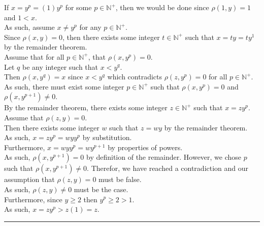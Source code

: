 \documentclass[a4paper,12pt]{article}
\begin{document}
\noindent If $x = y^p = (1)y^p$ for some $p \in \mathbb{N}^+$, then we would be done since $\rho(1, y) = 1$ and $1 < x$.\\

\noindent As such, assume $x \neq y^p$ for any $p \in \mathbb{N}^+$.\\

\noindent Since $\rho(x, y) = 0$, then there exists some integer $t \in \mathbb{N}^+$ such that $x = ty = ty^1$ by the remainder theorem.\\

\noindent Assume that for all $p \in \mathbb{N}^+$, that $\rho(x, y^p) = 0$.\\

\noindent Let $q$ be any integer such that $x < y^q$.\\

\noindent Then $\rho(x, y^q) = x$ since $x < y^q$ which contradicts $\rho(z, y^p) = 0$ for all $p \in \mathbb{N}^+$.\\

\noindent As such, there must exist some integer $p \in \mathbb{N}^+$ such that $\rho(x, y^p) = 0$ and $\rho(x, y^{p + 1}) \neq 0$.\\

\noindent By the remainder theorem, there exists some integer $z \in \mathbb{N}^+$ such that $x = zy^p$.\\

\noindent Assume that $\rho(z, y) = 0$.\\

\noindent Then there exists some integer $w$ such that $z = wy$ by the remainder theorem.\\

\noindent As such, $x = zy^p = wyy^p$ by substitution.\\

\noindent Furthermore, $x = wyy^p = wy^{p + 1}$ by properties of powers.\\

\noindent As such, $\rho(x, y^{p + 1}) = 0$ by definition of the remainder. However, we chose $p$ such that $\rho(x, y^{p + 1}) \neq 0$. Therefor, we have reached a contradiction and our assumption that $\rho(z, y) = 0$ must be false.\\

\noindent As such, $\rho(z, y) \neq 0$ must be the case.\\

\noindent Furthermore, since $y \geq 2$ then $y^p \geq 2 > 1$.\\

\noindent As such, $x = zy^p > z(1) = z$.


\begin{center}
\noindent\rule{8cm}{0.4pt}
\end{center}
\noindent \\
\end{document}

